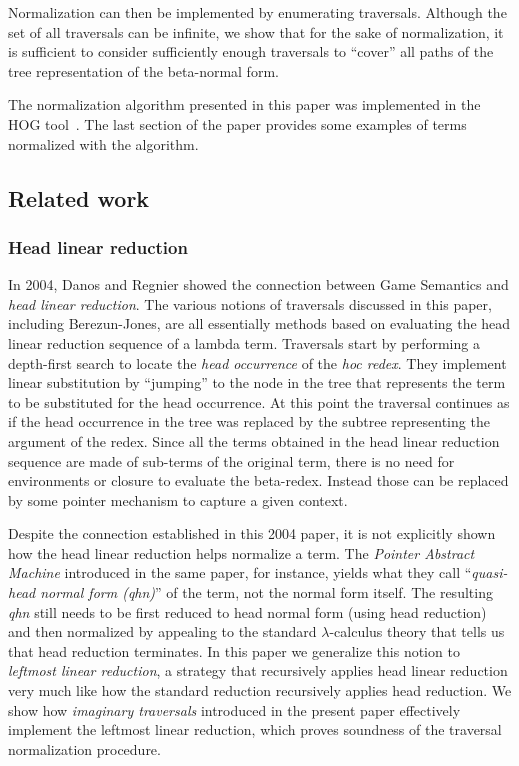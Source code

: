 \documentclass{article}
\theoremstyle{plain}
\theoremstyle{definition}
\theoremstyle{remark}
\begin{document}
Normalization can then be implemented by enumerating traversals. Although the set of all traversals can be infinite, we show that for the sake of normalization, it is sufficient to consider sufficiently enough traversals to ``cover'' all paths of the tree representation of the beta-normal form.

The normalization algorithm presented in this paper was implemented in the HOG tool~\cite{Blum-HogTool}. The last section of the paper provides some examples of terms normalized with the algorithm.

\subsection{Related work}

\subsubsection{Head linear reduction}
In 2004, Danos and Regnier showed the connection between Game Semantics and \emph{head linear reduction}. The various notions of traversals discussed in this paper, including Berezun-Jones, are all essentially methods based on evaluating the head linear reduction sequence of a lambda term. Traversals start by performing a depth-first search to locate the \emph{head occurrence} of the \emph{hoc redex}. They implement linear substitution by ``jumping'' to the node in the tree that represents the term to be substituted for the head occurrence. At this point the traversal continues as if the head occurrence in the tree was replaced by the subtree representing the argument of the redex. Since all the terms obtained in the head linear reduction sequence are made of sub-terms of the original term, there is no need for environments or closure to evaluate the beta-redex. Instead those can be replaced by some pointer mechanism to capture a given context.

Despite the connection established in this 2004 paper, it is not explicitly shown how the head linear reduction helps normalize a term. The \emph{Pointer Abstract Machine} introduced in the same paper, for instance, yields what they call ``\emph{quasi-head normal form (qhn)}'' of the term, not the normal form itself. The resulting \emph{qhn} still needs to be first reduced to head normal form (using head reduction) and then normalized by appealing to the standard $\lambda$-calculus theory that tells us that head reduction terminates.
In this paper we generalize this notion to \emph{leftmost linear reduction}, a strategy that recursively applies head linear reduction very much like how the standard reduction recursively applies head reduction. We show how \emph{imaginary traversals} introduced in the present paper effectively implement the leftmost linear reduction, which proves soundness of the traversal normalization procedure.
\end{document}
